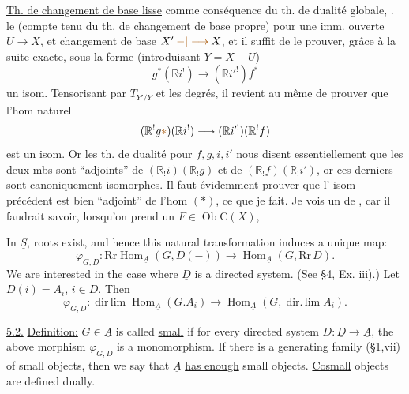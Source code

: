 \uline{Th. de changement de base lisse} comme conséquence
du th. de dualité globale, .
 le  (compte
tenu du th. de changement de base propre) pour une
imm. ouverte
$U\longrightarrow X$,  et changement de base
 $X'\mathbin{\unsure{-|\longrightarrow}}X$,
et il suffit de le prouver, grâce à la suite exacte,
sous la forme (introduisant $Y=X-U$)
\[
g^*(\mathbb{R}i^!)\longrightarrow(\mathbb{R}i'^!)f^*
\]
un isom. Tensorisant par
$T_{Y'/Y}$ et  les degrés, il
revient au même de prouver que l'hom
naturel
\[
(\mathbb{R}^!g\deleted{\unsure{*}})(\mathbb{R}i^!)\longrightarrow(\mathbb{R}i'^!)(\mathbb{R}^!f)
\]
est un isom. Or  les th. de dualité
pour $f,g,i,i'$ nous disent essentiellement que
les deux mbs sont ``adjoints'' de
$(\mathbb{R}_!i)(\mathbb{R}_!g)$ et de $(\mathbb{R}_!f)(\mathbb{R}_!i')$, or ces derniers
sont canoniquement isomorphes. Il faut évidemment
prouver que l' isom  précédent est bien
``adjoint'' de l'hom $(*)$, ce que je  fait.
Je vois un  de , car il faudrait
savoir, lorsqu'on prend un  $F\in\operatorname{Ob}\mathrm{C}(X)$,


In $\underline{S}$, roots exist, and hence this natural transformation
induces a unique map:
\[
\varphi_{G,D}:\mathrm{Rr}\operatorname{Hom}_{\underline{A}}(G,D(-))
\longrightarrow\operatorname{Hom}_{\underline{A}}(G,\mathrm{Rr}\,D).
\]
We are interested in the case where $\underline{D}$ is a directed system.
(See \S 4, Ex. iii).) Let $D(i)=A_i$, $i\in\underline{D}$. Then
\[
\varphi_{G,D}:\operatorname{dir\,lim}\operatorname{Hom}_{\underline{A}}(G.A_i)
\longrightarrow\operatorname{Hom}_{\underline{A}}(G,\operatorname{dir.\,lim}A_i).
\]

\uline{5.2.} \uline{Definition:} $G\in\underline{A}$ is called \uline{small} if for every directed
system $D:\underline{D}\longrightarrow\underline{A}$, the above morphism $\varphi_{G,D}$ is a monomorphism.
If there is a generating family (\S 1,vii) of small objects, then
we say that $\underline{A}$ \uline{has enough} small objects. \uline{Cosmall} objects are
defined dually.


